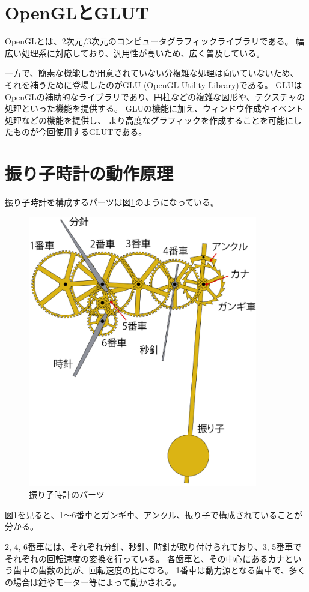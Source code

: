 \documentclass[a4j,titlepage]{jsarticle}
\begin{document}
\section{OpenGLとGLUT \cite{bib:1}}
OpenGLとは、2次元/3次元のコンピュータグラフィックライブラリである。
幅広い処理系に対応しており、汎用性が高いため、広く普及している。

一方で、簡素な機能しか用意されていない分複雑な処理は向いていないため、
それを補うために登場したのがGLU (OpenGL Utility Library)である。
GLUはOpenGLの補助的なライブラリであり、円柱などの複雑な図形や、テクスチャの処理といった機能を提供する。
GLUの機能に加え、ウィンドウ作成やイベント処理などの機能を提供し、
より高度なグラフィックを作成することを可能にしたものが今回使用するGLUTである。


\section{振り子時計の動作原理 \cite{bib:2}}
振り子時計を構成するパーツは図\ref{fig:parts}のようになっている。

\begin{figure}[H]
  \centering
  \includegraphics[width=10cm]{動作原理.pdf}
  \caption{振り子時計のパーツ}
  \label{fig:parts}
\end{figure}

図\ref{fig:parts}を見ると、1～6番車とガンギ車、アンクル、振り子で構成されていることが分かる。

2, 4, 6番車には、それぞれ分針、秒針、時針が取り付けられており、3, 5番車でそれぞれの回転速度の変換を行っている。
各歯車と、その中心にあるカナという歯車の歯数の比が、回転速度の比になる。
1番車は動力源となる歯車で、多くの場合は錘やモーター等によって動かされる。
\end{document}
